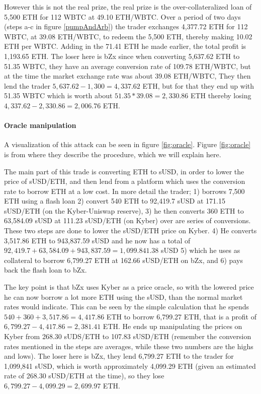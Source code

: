 However this is not the real prize, the real prize is the
over-collateralized loan of 5,500 ETH for 112 WBTC at 49.10 ETH/WBTC.
Over a period of two days (steps a-c in figure \ref{pumpAndArb}) the trader
exchanges 4,377.72 ETH for 112 WBTC, at 39.08 ETH/WBTC, to redeem the 5,500 ETH,
thereby making 10.02 ETH per WBTC. Adding in the 71.41 ETH he made earlier, the
total profit is 1,193.65 ETH. The loser here is bZx since when converting
5,637.62 ETH to 51.35 WBTC, they have an average conversion rate of 109.78
ETH/WBTC, but at the time the market exchange rate was about 39.08
ETH/WBTC, They then lend the trader $5,637.62-1,300=4,337.62$ ETH, but
for that they end up with 51.35 WBTC which is worth about
$51.35*39.08=2,330.86$ ETH thereby losing $4,337.62-2,330.86=2,006.76$
ETH.

\paragraph{Oracle manipulation} A visualization of this attack can be
seen in figure \ref{fig:oracle}. Figure \ref{fig:oracle} is from
\cite{attack} where they describe the procedure, which we will explain
here.

The main part of this trade is converting ETH to sUSD, in order to
lower the price of sUSD/ETH, and then lend from a platform which uses
the conversion rate to borrow ETH at a low cost. In more detail the
trader; 1) borrows 7,500 ETH using a flash loan 2) convert 540 ETH to
92,419.7 sUSD at 171.15 sUSD/ETH (on the Kyber-Uniswap reserve), 3) he
then converts 360 ETH to 63,584.09 sUSD at 111.23 sUSD/ETH (on Kyber)
over are series of conversions. These two steps are done to
lower the sUSD/ETH price on Kyber. 4) He converts 3,517.86 ETH to
943,837.59 sUSD and he now has a total of
$92,419.7+63,584.09+943,837.59=1,099.841.38$ sUSD 5) which he uses as
collateral to borrow 6,799.27 ETH at 162.66 sUSD/ETH on bZx, and 6)
pays back the flash loan to bZx.

The key point is that bZx uses Kyber as a price oracle, so with the
lowered price he can now borrow a lot more ETH using the sUSD, than the
normal market rates would indicate. This can be seen by the simple
calculation that he spends $540+360+3,517.86=4,417.86$ ETH to borrow
6,799.27 ETH, that is a profit of $6,799.27-4,417.86=2,381.41$ ETH. He
ends up manipulating the prices on Kyber from 268.30 sUDS/ETH to
107.83 sUSD/ETH (remember the conversion rates mentioned in the steps
are averages, while these two numbers are the highs and lows). The
loser here is bZx, they lend 6,799.27 ETH to the trader for 1,099,841
sUSD, which is worth approximately 4,099.29 ETH (given an estimated rate
of 268.30 sUSD/ETH at the time), so they lose $6,799.27-4,099.29=2,699.97$ ETH.
